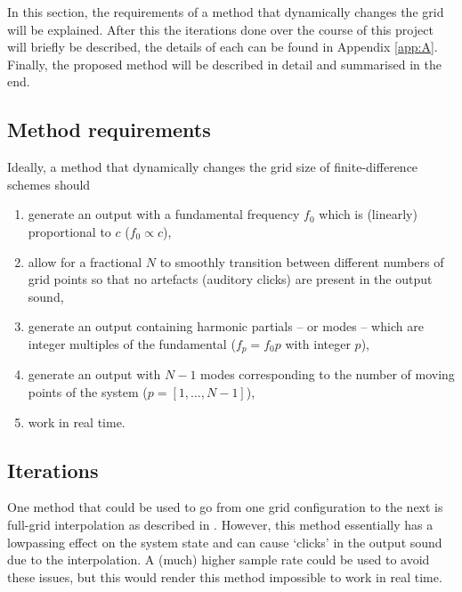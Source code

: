 \documentclass[dvipsnames, reprint]{JASA}
\begin{document}
In this section, the requirements of a method that dynamically changes the grid will be explained. After this the iterations done over the course of this project will briefly be described, the details of each can be found in Appendix \ref{app:A}. Finally, the proposed method will be described in detail and summarised in the end.

\subsection{Method requirements}
Ideally, a method that dynamically changes the grid size of finite-difference schemes should
\begin{enumerate}
    \item generate an output with a fundamental frequency $f_0$ %
    which is (linearly) proportional to $c$ ($f_0 \propto c$),
    \item allow for a fractional $N$ to smoothly transition 
    between different numbers of grid points so that no artefacts (auditory clicks) are present in the output sound,
    \item generate an output containing harmonic partials -- or modes -- which are integer multiples of the fundamental ($f_p = f_0 p$ with integer $p$),
    \item generate an output with $N-1$ modes corresponding to the number of moving points of the system ($p = [1, \hdots, N-1]$),\\
    \item work in real time.
\end{enumerate}
%

\subsection{Iterations}\label{sec:iterations}
One method that could be used to go from one grid configuration to the next is full-grid interpolation as described in \cite[Chap. 5]{bilbao2009}. However, this method essentially has a lowpassing effect on the system state and can cause `clicks' in the output sound due to the interpolation. A (much) higher sample rate could be used to avoid these issues, but this would render this method impossible to work in real time.
\end{document}
